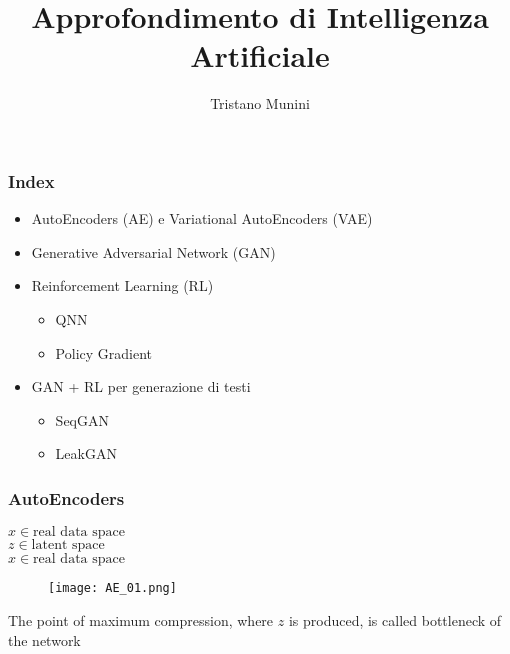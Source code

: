 \documentclass{beamer}
\title{Approfondimento di Intelligenza Artificiale}
\author{Tristano Munini}
\begin{document}
{
  \frame{\titlepage}
}

\begin{frame}
\frametitle{Index}
\begin{itemize}
  \item AutoEncoders (AE) e Variational AutoEncoders (VAE)
  \item Generative Adversarial Network (GAN)
  \item Reinforcement Learning (RL)
    \begin{itemize}
      \item QNN
      \item Policy Gradient
    \end{itemize}
  \item GAN + RL per generazione di testi
    \begin{itemize}
      \item SeqGAN
      \item LeakGAN
    \end{itemize}
\end{itemize}
\end{frame}



\begin{frame}
\frametitle{AutoEncoders}
$ x \in \textrm{real data space}$
\\
$ z \in \textrm{latent space}$
\\
$ \hat x \in \textrm{real data space}$


\begin{figure}[ht]
  \texttt{[image: AE\_01.png]}
\end{figure}

The point of maximum compression, where $z$ is produced, is called bottleneck of the network

\end{frame}
\end{document}

